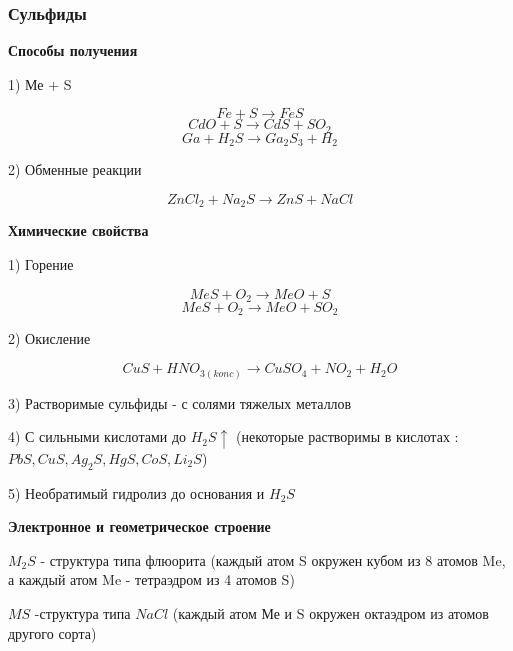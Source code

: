 \subsubsection*{Сульфиды}

\textbf{Способы получения}

1) Ме + S

$$Fe + S \rightarrow FeS$$
$$CdO + S \rightarrow CdS + SO_2$$
$$Ga + H_2S \rightarrow Ga_2S_3 + H_2$$

2) Обменные реакции

$$ZnCl_2 + Na_2S \rightarrow ZnS + NaCl$$

\textbf{Химические свойства}

1) Горение

$$MeS + O_2 \rightarrow MeO + S$$
$$MeS + O_2 \rightarrow MeO + SO_2$$

2) Окисление

$$CuS + HNO_{3(konc)} \rightarrow CuSO_4 + NO_2 + H_2O$$

3) Растворимые сульфиды - с солями тяжелых металлов

4) С сильными кислотами до $H_2S\uparrow$ (некоторые растворимы в кислотах : $PbS, CuS, Ag_2S, HgS, CoS, Li_2S$)

5) Необратимый гидролиз до основания и $H_2S$

\textbf{Электронное и геометрическое строение}

$M_2S$ - структура типа флюорита (каждый атом S окружен кубом из 8 атомов Me, а каждый атом Me - тетраэдром из 4 атомов S)

$MS$ -структура типа $NaCl$ (каждый атом Ме и S окружен октаэдром из атомов другого сорта)
